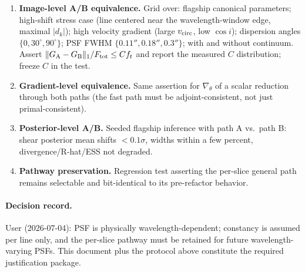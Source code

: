 \documentclass[11pt]{article}
\begin{document}
\begin{enumerate}
\item \textbf{Image-level A/B equivalence.} Grid over: flagship canonical
parameters; high-shift stress case (line centered near the wavelength-window
edge, maximal $|d_k|$); high velocity gradient (large $v_{\rm circ}$, low
$\cos i$); dispersion angles $\{0, 30^\circ, 90^\circ\}$; PSF FWHM
$\{0.11'', 0.18'', 0.3''\}$; with and without continuum. Assert
$\|G_{\rm A}-G_{\rm B}\|_1 / F_{\rm tot} \le C f_t$ and report the measured
$C$ distribution; freeze $C$ in the test.
\item \textbf{Gradient-level equivalence.} Same assertion for
$\nabla_\theta$ of a scalar reduction through both paths (the fast path must
be adjoint-consistent, not just primal-consistent).
\item \textbf{Posterior-level A/B.} Seeded flagship inference with path A
vs.\ path B: shear posterior mean shifts $< 0.1\sigma$, widths within a few
percent, divergence/R-hat/ESS not degraded.
\item \textbf{Pathway preservation.} Regression test asserting the per-slice
general path remains selectable and bit-identical to its pre-refactor
behavior.
\end{enumerate}

\paragraph{Decision record.} User (2026-07-04): PSF is physically
wavelength-dependent; constancy is assumed per line only, and the per-slice
pathway must be retained for future wavelength-varying PSFs. This document
plus the protocol above constitute the required justification package.
\end{document}
